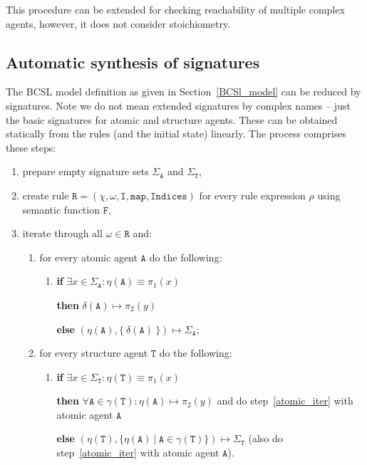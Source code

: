 \documentclass[12pt]{fithesis2}
\begin{document}
This procedure can be extended for checking reachability of multiple complex agents, however, it does not consider stoichiometry.

\subsection{Automatic synthesis of signatures}

The BCSL model definition as given in Section~\ref{BCSl_model} can be reduced by signatures. Note we do not mean extended signatures by complex names -- just the basic signatures for atomic and structure agents. These can be obtained statically from the rules (and the initial state) linearly. The process comprises these steps:

\begin{enumerate}
\item prepare empty signature sets $\Sigma_\mathtt{A}$ and $\Sigma_\mathtt{T}$, 
\item create rule $\mathtt{R} = (\chi, \omega, \mathtt{I}, \mathtt{map}, \mathtt{Indices})$ for every rule expression $\rho$ using semantic function $\mathtt{F}$,
\item iterate through all $\omega \in \mathtt{R}$ and:
\begin{enumerate}
  \item \label{atomic_iter} for every atomic agent $\mathtt{A}$ do the following:
  	\begin{enumerate}
  		\item \textbf{if} $\exists x \in \Sigma_\mathtt{A}: \eta(\mathtt{A}) \equiv \pi_1(x) $ 

  		\textbf{then} $\delta(\mathtt{A}) \mapsto \pi_2(y)$

  		\textbf{else} $(\eta(\mathtt{A}), \{~\delta(\mathtt{A})~\}) \mapsto \Sigma_\mathtt{A}$;
	\end{enumerate}
  \item \label{structure_iter} for every structure agent $\mathtt{T}$ do the following:
	\begin{enumerate}
	  \item \textbf{if} $\exists x \in \Sigma_\mathtt{T}: \eta(\mathtt{T}) \equiv \pi_1(x) $

	  \textbf{then} $\forall \mathtt{A} \in \gamma(\mathtt{T}): \eta(\mathtt{A}) \mapsto \pi_2(y)$ and do step~\ref{atomic_iter} with atomic agent $\mathtt{A}$

	  \textbf{else} $(\eta(\mathtt{T}), \{ \eta(\mathtt{A}) ~|~ \mathtt{A} \in \gamma(\mathtt{T}) \}) \mapsto \Sigma_\mathtt{T}$ (also do step~\ref{atomic_iter} with atomic agent $\mathtt{A}$).
	\end{enumerate}
\end{enumerate}
\end{enumerate}
\end{document}
